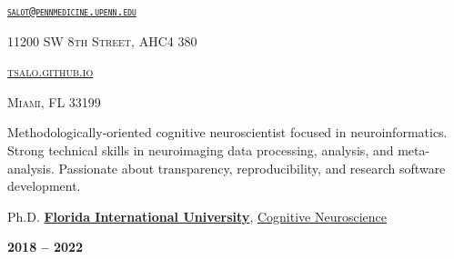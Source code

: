 \documentclass[10pt]{article}
\date{}
\newcommand{\namestyle}{\Huge \fontfamily{lmr}\selectfont}
\newcommand{\iconstyle}{\LARGE}
\newcommand{\headstyle}{\scshape \normalsize \textcolor{light-gray}}
\newcommand{\sectionstyle}{\LARGE \fontfamily{lmr}\selectfont}
\begin{document}
\begin{center}
	\namestyle{TAYLOR SALO}

	\bigskip

	\iconstyle{\href{https://github.com/tsalo}{\faGithubSquare}}
	\enspace
	\iconstyle{\href{https://orcid.org/0000-0001-9813-3167}{}}
	\enspace
	\iconstyle{\href{https://scholar.google.com/citations?user=YbH1akIAAAAJ}{}}
	\enspace
	\iconstyle{\href{https://osf.io/iwpvm/}{}}
\end{center}

\begin{minipage}[t]{.5\linewidth}
\flushleft
\headstyle{\href{mailto:salot@pennmedicine.upenn.edu}{\nolinkurl{salot@pennmedicine.upenn.edu}}}
\end{minipage}
\hfill
\begin{minipage}[t]{.5\linewidth}
\flushright
\headstyle{11200 SW 8th Street, AHC4 380}
\end{minipage}

\begin{minipage}[t]{.3\linewidth}
\flushleft
\headstyle{\href{https://tsalo.github.io}{tsalo.github.io}}
\end{minipage}
\hfill
\begin{minipage}[t]{.7\linewidth}
\flushright
\headstyle{Miami, FL 33199}
\end{minipage}


\bigskip

\begin{center}\sectionstyle{PROFILE}\end{center}

Methodologically-oriented cognitive neuroscientist focused in neuroinformatics.
Strong technical skills in neuroimaging data processing, analysis, and meta-analysis.
Passionate about transparency, reproducibility, and research software development.

\bigskip

\begin{center}\sectionstyle{EDUCATION}\end{center}

\begin{minipage}[t]{.7\linewidth}
	\flushleft
	\noindent
	Ph.D.
	\href{https://fiu.edu}{\textbf{Florida International University}},
	\href{https://case.fiu.edu/psychology/phd-in-cognitive-neuroscience/}{Cognitive Neuroscience}
	\end{minipage}
	\hfill
	\begin{minipage}[t]{.3\linewidth}
	\flushright
	\noindent
	\textsc{\textbf{2018 -- 2022}}
\end{minipage}
\end{document}
